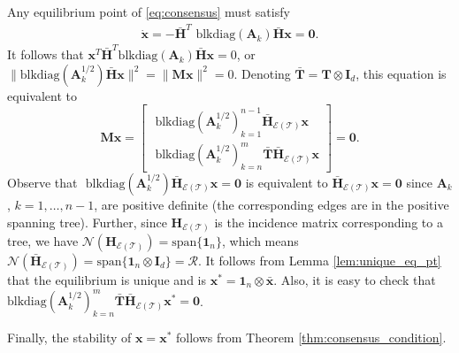 \documentclass[draftclsnofoot,11pt,onecolumn]{IEEEtran}
\newcommand{\m}[1]{\mathbf{#1}}
\newcommand{\mc}[1]{\mathcal{#1}}
\begin{document}
\begin{IEEEproof}
Any equilibrium point of \eqref{eq:consensus} must satisfy
\begin{align}
\dot{\m{x}} = - \bar{\m{H}}^T \text{ blkdiag} (\m{A}_k) \bar{\m{H}} \m{x} = \m{0}.
\end{align}
It follows that
$\m{x}^T\bar{\m{H}}^T \text{blkdiag} (\m{A}_k) \bar{\m{H}} \m{x} =0$, or $\|\text{blkdiag} (\m{A}_k^{{1}/{2}}) \bar{\m{H}} \m{x}\|^2 =\|\m{M} \m{x}\|^2 = 0$. Denoting $\bar{\m{T}} = \m{T} \otimes \m{I}_d$, this equation is equivalent to
\begin{equation} \label{eq:tree-graph}
\m{M}\m{x} = \begin{bmatrix}
\text{ blkdiag}(\m{A}_k^{{1}/{2}})_{k=1}^{n-1} \bar{\m{H}}_{\mc{E}(\mc{T})} \m{x} \\
\text{ blkdiag}(\m{A}_k^{{1}/{2}})_{k=n}^{m} \bar{\m{T}} \bar{\m{H}}_{\mc{E}(\mc{T})} \m{x}
\end{bmatrix} = \m{0}.
\end{equation}
Observe that $\text{ blkdiag}(\m{A}_k^{{1}/{2}})\bar{\m{H}}_{\mc{E}(\mc{T})}\m{x} = \m{0}$ is equivalent to $\bar{\m{H}}_{\mc{E}(\mc{T})}\m{x} = \m{0}$ since $\m{A}_k$, $k=1, \ldots, n-1$, are positive definite (the corresponding edges are in the positive spanning tree). Further, since $\m{H}_{\mc{E}(\mc{T})}$ is the incidence matrix corresponding to a tree, we have $\mc{N}(\m{H}_{\mc{E}(\mc{T})}) = \text{span} \{ \m{1}_n \}$, which means $\mc{N}(\m{\bar{H}}_{\mc{E}(\mc{T})}) = \text{span}\{ \m{1}_n \otimes \m{I}_{d}\} = \mc{R}$. It follows from Lemma \ref{lem:unique_eq_pt} that the equilibrium is unique and is $\m{x}^* = \m{1}_n \otimes \bar{\m{x}}$. 
Also, it is easy to check that $\text{blkdiag}(\m{A}_k^{{1}/{2}})_{k=n}^{m} \bar{\m{T}} \bar{\m{H}}_{\mc{E}(\mc{T})} \m{x}^* = \m{0}$.

Finally, the stability of $\m{x}=\m{x}^*$ follows from Theorem \ref{thm:consensus_condition}.
\end{IEEEproof}
\end{document}
